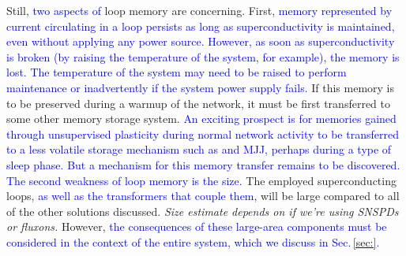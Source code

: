 \documentclass[twocolumn]{article}
\begin{document}
Still, \textcolor{blue}{two aspects of} loop memory are concerning. First, \textcolor{blue}{memory represented by current circulating in a loop persists as long as superconductivity is maintained, even without applying any power source. However, as soon as superconductivity is broken (by raising the temperature of the system, for example), the memory is lost. The temperature of the system may need to be raised to perform maintenance or inadvertently if the system power supply fails.} If this memory is to be preserved during a warmup of the network, it must be first transferred to some other memory storage system. \textcolor{blue}{An exciting prospect is for memories gained through unsupervised plasticity during normal network activity to be transferred to a less volatile storage mechanism such as and MJJ, perhaps during a type of sleep phase. But a mechanism for this memory transfer remains to be discovered. The second weakness of loop memory is the size.} The employed superconducting loops, \textcolor{blue}{as well as the transformers that couple them}, will be large compared to all of the other solutions discussed. \textit{Size estimate depends on if we're using SNSPDs or fluxons.} However, \textcolor{blue}{the consequences of these large-area components must be considered in the context of the entire system, which we discuss in Sec.\,\ref{sec:}.} 

\end{document}
